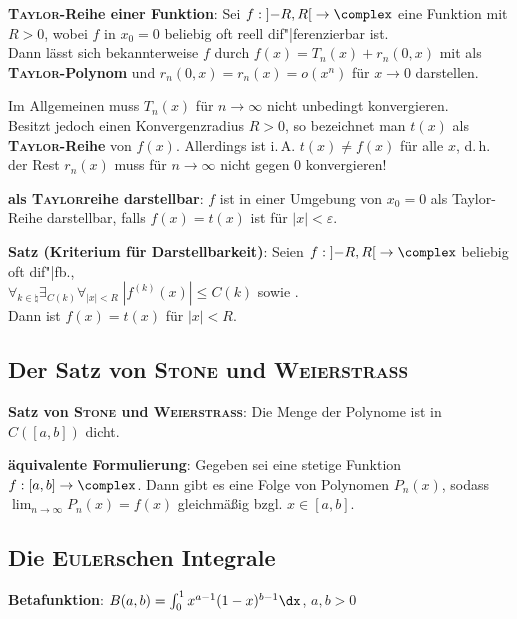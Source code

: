 \textbf{\textsc{Taylor}-Reihe einer Funktion}:
Sei $f: \left]-R,R\right[ \rightarrow \complex$ eine Funktion mit $R > 0$,
wobei $f$ in $x_0 = 0$ beliebig oft reell dif"|ferenzierbar ist. \\
Dann lässt sich bekannterweise $f$ durch $f(x) = T_n(x) + r_n(0, x)$
mit  als
\textbf{\textsc{Taylor}-Polynom} und $r_n(0, x) = r_n(x) = o(x^n)$ für
$x \to 0$ darstellen.

Im Allgemeinen muss $T_n(x)$ für $n \to \infty$ nicht unbedingt
konvergieren. \\
Besitzt jedoch  einen Konvergenzradius $R > 0$,
so bezeichnet man $t(x)$ als \textbf{\textsc{Taylor}-Reihe} von $f(x)$.
Allerdings ist i.\,A. $t(x) \not= f(x)$ für alle $x$, d.\,h.
der Rest $r_n(x)$ muss für $n \to \infty$ nicht gegen $0$ konvergieren!

\textbf{als \textsc{Taylor}reihe darstellbar}:
$f$ ist in einer Umgebung von $x_0 = 0$ als Taylor-Reihe darstellbar,
falls $f(x) = t(x)$ ist für $|x| < \varepsilon$.

\textbf{Satz (Kriterium für Darstellbarkeit)}:
Seien $f: \left]-R,R\right[ \rightarrow \complex$ beliebig oft dif"|fb., \\
$\forall_{k \in \natural} \exists_{C(k)} \forall_{|x| < R}\;
|f^{(k)}(x)| \le C(k)$ sowie
. \\
Dann ist $f(x) = t(x)$ für $|x| < R$.

\subsection{%
    Der Satz von \textsc{Stone} und \textsc{Weierstraß}%
}

\textbf{Satz von \textsc{Stone} und \textsc{Weierstraß}}:
Die Menge der Polynome ist in $C([a,b])$ dicht.

\textbf{äquivalente Formulierung}:
Gegeben sei eine stetige Funktion $f: [a,b] \rightarrow \complex$.
Dann gibt es eine Folge von Polynomen $P_n(x)$, sodass
$\lim_{n \to \infty} P_n(x) = f(x)$ gleichmäßig bzgl. $x \in [a,b]$.

\subsection{%
    Die \textsc{Euler}schen Integrale%
}

\textbf{Betafunktion}:
$B(a, b) = \int_0^1 x^{a-1} (1 - x)^{b-1} \dx$, $a, b > 0$

